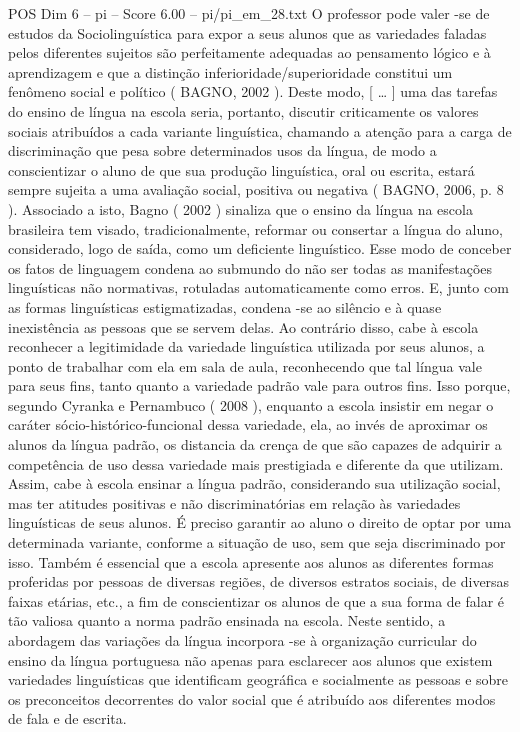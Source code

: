 \begin{textsample}{POS Dim 6 – pi – Score 6.00 – pi/pi\_em\_28.txt}
O professor pode valer -se de estudos da Sociolinguística para expor a seus alunos que as variedades faladas pelos diferentes sujeitos são perfeitamente adequadas ao pensamento lógico e à aprendizagem e que a distinção inferioridade/superioridade constitui um fenômeno social e político ( BAGNO, 2002 ).
Deste modo, [ … ] uma das tarefas do ensino de língua na escola seria, portanto, discutir criticamente os valores sociais atribuídos a cada variante linguística, chamando a atenção para a carga de discriminação que pesa sobre determinados usos da língua, de modo a conscientizar o aluno de que sua produção linguística, oral ou escrita, estará sempre sujeita a uma avaliação social, positiva ou negativa ( BAGNO, 2006, p. 8 ).
Associado a isto, Bagno ( 2002 ) sinaliza que o ensino da língua na escola brasileira tem visado, tradicionalmente, reformar ou consertar a língua do aluno, considerado, logo de saída, como um deficiente linguístico.
Esse modo de conceber os fatos de linguagem condena ao submundo do não ser todas as manifestações linguísticas não normativas, rotuladas automaticamente como erros.
E, junto com as formas linguísticas estigmatizadas, condena -se ao silêncio e à quase inexistência as pessoas que se servem delas.
Ao contrário disso, cabe à escola reconhecer a legitimidade da variedade linguística utilizada por seus alunos, a ponto de trabalhar com ela em sala de aula, reconhecendo que tal língua vale para seus fins, tanto quanto a variedade padrão vale para outros fins.
Isso porque, segundo Cyranka e Pernambuco ( 2008 ), enquanto a escola insistir em negar o caráter sócio-histórico-funcional dessa variedade, ela, ao invés de aproximar os alunos da língua padrão, os distancia da crença de que são capazes de adquirir a competência de uso dessa variedade mais prestigiada e diferente da que utilizam.
Assim, cabe à escola ensinar a língua padrão, considerando sua utilização social, mas ter atitudes positivas e não discriminatórias em relação às variedades linguísticas de seus alunos.
É preciso garantir ao aluno o direito de optar por uma determinada variante, conforme a situação de uso, sem que seja discriminado por isso.
Também é essencial que a escola apresente aos alunos as diferentes formas proferidas por pessoas de diversas regiões, de diversos estratos sociais, de diversas faixas etárias, etc., a fim de conscientizar os alunos de que a sua forma de falar é tão valiosa quanto a norma padrão ensinada na escola.
Neste sentido, a abordagem das variações da língua incorpora -se à organização curricular do ensino da língua portuguesa não apenas para esclarecer aos alunos que existem variedades linguísticas que identificam geográfica e socialmente as pessoas e sobre os preconceitos decorrentes do valor social que é atribuído aos diferentes modos de fala e de escrita.

\end{textsample}
